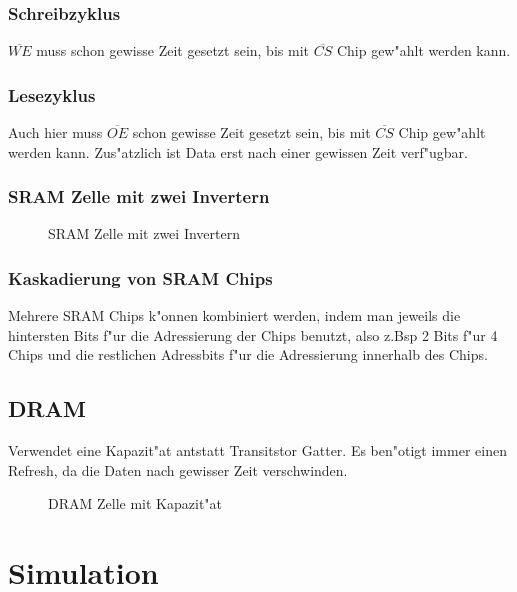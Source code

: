 \documentclass[german, 10pt, a4paper, twocolumn]{scrartcl}
\theoremstyle{definition}
\begin{document}
\subsubsection{Schreibzyklus}

$\overline{WE}$ muss schon gewisse Zeit gesetzt sein, bis mit $\overline{CS}$ Chip gew"ahlt werden kann.


\subsubsection{Lesezyklus}

Auch hier muss $\overline{OE}$ schon gewisse Zeit gesetzt sein, bis mit $\overline{CS}$ Chip gew"ahlt werden kann. Zus"atzlich ist Data erst nach einer gewissen Zeit verf"ugbar.

\subsubsection{SRAM Zelle mit zwei Invertern}

\begin{figure}[hbt]
 
 \centerline{\box\graph}
 \caption{SRAM Zelle mit zwei Invertern}
 \label{sram}
\end{figure}

\subsubsection{Kaskadierung von SRAM Chips}

Mehrere SRAM Chips k"onnen kombiniert werden, indem man jeweils die hintersten Bits f"ur die Adressierung der Chips benutzt, also z.Bsp 2 Bits f"ur 4 Chips und die restlichen Adressbits f"ur die Adressierung innerhalb des Chips.

\subsection{DRAM}

Verwendet eine Kapazit"at antstatt Transitstor Gatter. Es ben"otigt immer einen Refresh, da die Daten nach gewisser Zeit verschwinden. 

\begin{figure}[hbt]
 
 \centerline{\box\graph}
 \caption{DRAM Zelle mit Kapazit"at}
 \label{dram}
\end{figure}

\section{Simulation}
\end{document}
